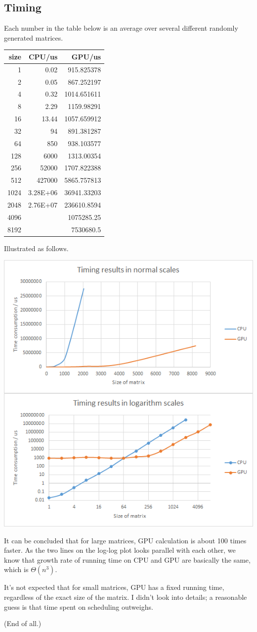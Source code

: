 \begin{homeworkProblem}
\subsection{Timing}
Each number in the table below is an average over several different randomly generated matrices.
\begin{center}
\begin{tabular}{rrr}
\hline
size& CPU/us& GPU/us\\
\hline
1& 	0.02& 	915.825378\\
2& 	0.05& 	867.252197\\
4& 	0.32& 	1014.651611\\
8& 	2.29& 	1159.98291\\
16& 	13.44& 	1057.659912\\
32& 	94& 	891.381287\\
64& 	850& 	938.103577\\
128& 	6000& 	1313.00354\\
256& 	52000& 	1707.822388\\
512& 	427000& 	5865.757813\\
1024& 	3.28E+06& 	36941.33203\\
2048& 	2.76E+07& 	236610.8594\\
4096& 	& 	1075285.25\\
8192& 	& 	7530680.5\\
\hline
\end{tabular}
\end{center}

Illustrated as follows.

\includegraphics[width=.75\columnwidth]{matrix}

It can be concluded that for large matrices, GPU calculation is about 100 times faster. As the two lines on the log-log plot looks parallel with each other, we know that growth rate of running time on CPU and GPU are basically the same, which is $\Theta(n^3)$.

It's not expected that for small matrices, GPU has a fixed running time, regardless of the exact size of the matrix. I didn't look into details; a reasonable guess is that time spent on scheduling outweighs.

\end{homeworkProblem}

(End of all.)


